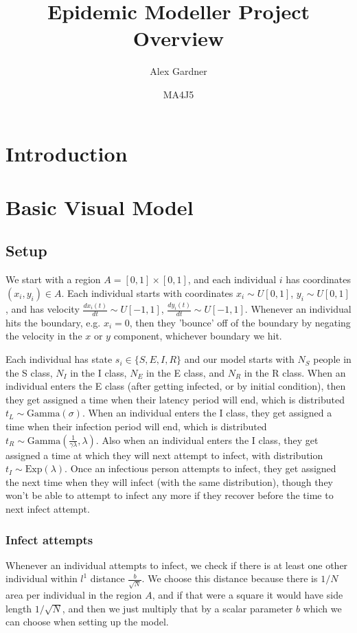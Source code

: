\documentclass[11pt]{article}
\begin{document}
\title{Epidemic Modeller Project Overview}
\author{Alex Gardner}
\date{MA4J5}
\maketitle

\section*{Introduction}

\section*{Basic Visual Model}
\subsection*{Setup}
We start with a region $A=[0,1]\times [0,1]$, and each individual $i$ has coordinates $(x_i, y_i)\in A$. Each individual starts with coordinates $x_i \sim U[0,1]$, $y_i \sim U[0,1]$, and has velocity $\frac{dx_i(t)}{dt} \sim U[-1,1]$, $\frac{dy_i(t)}{dt} \sim U[-1,1]$. Whenever an individual hits the boundary, e.g. $x_i=0$, then they 'bounce' off of the boundary by negating the velocity in the $x$ or $y$ component, whichever boundary we hit.

Each individual has state $s_i\in \{S,E,I,R\}$ and our model starts with $N_S$ people in the S class, $N_I$ in the I class, $N_E$ in the E class, and $N_R$ in the R class. When an individual enters the E class (after getting infected, or by initial condition), then they get assigned a time when their latency period will end, which is distributed $t_L \sim \text{Gamma}(\sigma)$. When an individual enters the I class, they get assigned a time when their infection period will end, which is distributed $t_R \sim \text{Gamma}(\frac{1}{\gamma\lambda}, \lambda)$. Also when an individual enters the I class, they get assigned a time at which they will next attempt to infect, with distribution $t_I\sim \text{Exp}(\lambda)$. Once an infectious person attempts to infect, they get assigned the next time when they will infect (with the same distribution), though they won't be able to attempt to infect any more if they recover before the time to next infect attempt.
\subsubsection*{Infect attempts}
Whenever an individual attempts to infect, we check if there is at least one other individual within $l^1$ distance $\frac{b}{\sqrt{N}}$. We choose this distance because there is $1/N$ area per individual in the region $A$, and if that were a square it would have side length $1/\sqrt{N}$, and then we just multiply that by a scalar parameter $b$ which we can choose when setting up the model.
\end{document}
